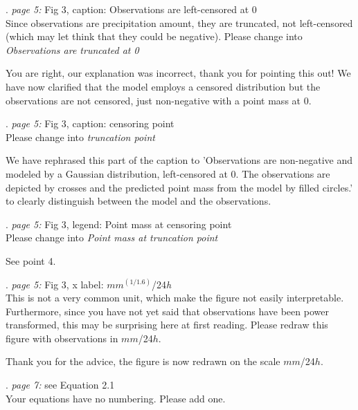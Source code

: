 \documentclass[american,foldmarks=false,noconfig]{uibklttr}
\newenvironment{review}{\fontshape{\itdefault}\fontseries{\bfdefault} \selectfont \smallskip}{\par}
\begin{document}
\begin{review}
3. {\color{quotecolor}\textit{page 5:} Fig 3, caption: Observations 
are left-censored at 0}\\
Since observations are precipitation amount, they are truncated, not 
left-censored (which may let think that they could be negative). 
Please change into \textit{Observations are truncated at 0}
\end{review}

You are right, our explanation was incorrect, thank you for pointing
this out! We have now clarified that the model employs a censored
distribution but the observations are not censored, just non-negative
with a point mass at 0.


\begin{review}
4. {\color{quotecolor}\textit{page 5:} Fig 3, caption: censoring point}\\
Please change into \textit{truncation point}
\end{review}

We have rephrased this part of the caption to 'Observations are non-negative 
and modeled by a Gaussian distribution, left-censored at 0.
The observations are depicted by crosses and the predicted point mass
from the model by filled circles.' to clearly distinguish between the model
and the observations.


\begin{review}
5. {\color{quotecolor}\textit{page 5:} Fig 3, legend: Point mass at 
censoring point}\\
Please change into \textit{Point mass at truncation point}
\end{review}

See point 4.

\begin{review}
6. {\color{quotecolor}\textit{page 5:} Fig 3, x label: $mm^{(1/1.6)}$/24\textit{h}}\\
This is not a very common unit, which make the figure not easily 
interpretable. Furthermore, since you have not yet said that 
observations have been power transformed, this may be surprising 
here at first reading. Please redraw this figure with 
observations in $mm$/24$h$.
\end{review}

Thank you for the advice, the figure is now redrawn on the scale $mm$/24$h$.


\begin{review}
7. {\color{quotecolor}\textit{page 7:} see Equation 2.1}\\
Your equations have no numbering. Please add one.
\end{review}
\end{document}
